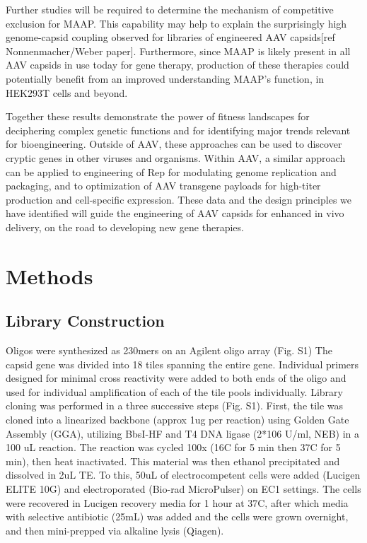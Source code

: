 Further studies will be required to determine the mechanism of competitive exclusion for MAAP. This capability may help to explain the surprisingly high genome-capsid coupling observed for libraries of engineered AAV capsids[ref Nonnenmacher/Weber paper]. Furthermore, since MAAP is likely present in all AAV capsids in use today for gene therapy, production of these therapies could potentially benefit from an improved understanding MAAP’s function, in HEK293T cells and beyond. 

Together these results demonstrate the power of fitness landscapes for deciphering complex genetic functions and for identifying major trends relevant for bioengineering. Outside of AAV, these approaches can be used to discover cryptic genes in other viruses and organisms. Within AAV, a similar approach can be applied to engineering of Rep for modulating genome replication and packaging, and to optimization of AAV transgene payloads for high-titer production and cell-specific expression. These data and the design principles we have identified will guide the engineering of AAV capsids for enhanced in vivo delivery, on the road to developing new gene therapies.



\section{Methods}

\subsection{Library Construction}
Oligos were synthesized as 230mers on an Agilent oligo array (Fig. S1) The capsid gene was divided into 18 tiles spanning the entire gene. Individual primers designed for minimal cross reactivity were added to both ends of the oligo and used for individual amplification of each of the tile pools individually. Library cloning was performed in a three successive steps (Fig. S1). First, the tile was cloned into a linearized backbone (approx 1ug per reaction) using Golden Gate Assembly (GGA), utilizing BbsI-HF and T4 DNA ligase (2*106 U/ml, NEB) in a 100 uL reaction. The reaction was cycled 100x (16C for 5 min then 37C for 5 min), then heat inactivated. This material was then ethanol precipitated and dissolved in 2uL TE. To this, 50uL of electrocompetent cells were added (Lucigen ELITE 10G) and electroporated (Bio-rad MicroPulser) on EC1 settings. The cells were recovered in Lucigen recovery media for 1 hour at 37C, after which media with selective antibiotic (25mL) was added and the cells were grown overnight, and then mini-prepped via alkaline lysis (Qiagen).

